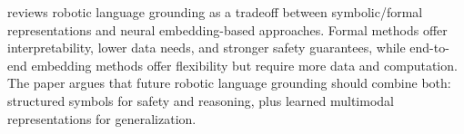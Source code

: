 \documentclass[a4paper]{article}
\title{}
\date{}
\author{Mohammad Rahmani}
\begin{document}
    \maketitle
    \cite{cohen-2024-a-survey-of-robotic-language-grounding-tradeoffs-between-symbols-and-embeddings} reviews robotic language grounding as a tradeoff between symbolic/formal representations and neural embedding-based approaches. Formal methods offer interpretability, lower data needs, and stronger safety guarantees, while end-to-end embedding methods offer flexibility but require more data and computation. The paper argues that future robotic language grounding should combine both: structured symbols for safety and reasoning, plus learned multimodal representations for generalization.
    
    
    
    
\end{document}
